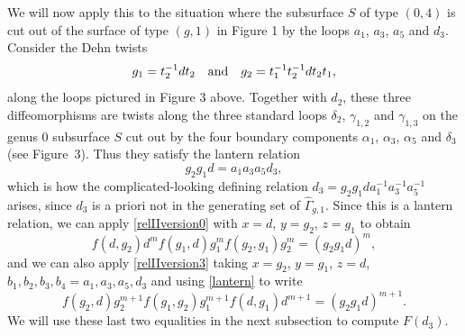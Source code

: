 \documentclass[a4paper,10pt,reqno]{amsart}
\newcommand\GGone{\widehat{\Gamma}_{g,1}}
\begin{document}
We will now apply this to the situation where the subsurface $S$ of type $(0,4)$ is cut out of
the surface of type $(g,1)$ in Figure 1 by the loops $a_1$, $a_3$, $a_5$ and $d_3$. Consider
the Dehn twists
\begin{equation}\label{g1g2def}
g_1=t_2^{-1}dt_2\ \ \ {\rm and}\ \ \ g_2=t_1^{-1}t_2^{-1}dt_2t_1,
\end{equation}
along the loops pictured in Figure 3 above. 
Together with $d_2$, these three diffeomorphisms are twists along the three
standard loops $\delta_2$, $\gamma_{1,2}$ and $\gamma_{1,3}$ on the genus $0$ 
subsurface $S$ cut out by the four boundary components $\alpha_1$, 
$\alpha_3$, $\alpha_5$ and $\delta_3$ (see Figure~3). Thus they satisfy the lantern relation
\begin{equation}\label{lantern}
g_2g_1d=a_1a_3a_5d_3,
\end{equation}
which is how the complicated-looking defining relation $d_3=g_2g_1da_1^{-1}a_3^{-1}a_5^{-1}$
arises, since $d_3$ is a priori not in the generating set of $\GGone$. Since this is a lantern
relation, we can apply \eqref{relIIversion0}
with $x=d$, $y=g_2$, $z=g_1$ to obtain
\begin{equation}\label{relIIversion4}
f(d,g_2)d^mf(g_1,d)g_1^mf(g_2,g_1)g_2^m=(g_2g_1d)^m,
\end{equation}
and we can also apply \eqref{relIIversion3} taking
$x=g_2$, $y=g_1$, $z=d$, $b_1, b_2, b_3, b_4=a_1,a_3,a_5,d_3$  and using \eqref{lantern} to write
\begin{equation}\label{relIIversion5}
f(g_2,d)g_2^{m+1}f(g_1,g_2)g_1^{m+1}f(d,g_1)d^{m+1}=(g_2g_1d)^{m+1}.
\end{equation}
We will use these last two equalities in the next subsection to compute $F(d_3)$.
\end{document}
